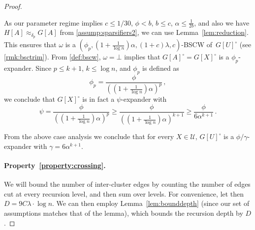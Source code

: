 \documentclass[epsfig,letter,11pt]{article}
\numberwithin{equation}{section}
\begin{document}
\begin{proof}
\begin{itemize}
		As our parameter regime implies $c \le 1/30$, $\phi < b$, $b \le c$, $\alpha \le \frac{1}{2b}$, and also we have $H[A] \approx_{\delta_p} G[A]$ from  \cref{assump:sparsifiers2}, we can use Lemma~\ref{lem:reduction}. This ensures that $\omega$ is a $(\phi_p,(1+\frac{1}{\log n})\alpha,(1+c)\lambda, c)$-BSCW of~$G[U]^\circ$ (see \cref{rmk:bsctrim}). From \cref{def:bscw}, $\omega=\bot$ implies that $G[A]^\circ=G[X]^\circ$ is a $\phi_p$-expander. Since $p \le k+1$, $k \le \log n$, and $\phi_p$ is defined as
		\begin{equation*}
			\phi_p = \frac{\phi}{\left(\left(1+\frac{1}{\log n}\right)\alpha\right)^p} \, ,
		\end{equation*}
		we conclude that $G[X]^\circ$ is in fact a $\psi$-expander with
		\begin{equation*}
			\psi = \frac{\phi}{\left(\left(1+\frac{1}{\log n}\right)\alpha\right)^p}  \ge \frac{\phi}{\left(\left(1+\frac{1}{\log n}\right)\alpha\right)^{k+1}} \ge \frac{\phi}{6\alpha^{k+1}} \, . 
		\end{equation*}
	\end{itemize}
	From the above case analysis we conclude that for every $X \in\mathcal{U}$, $G[U]^\circ$ is a $\phi/\gamma$-expander with $\gamma = 6 \alpha^{k+1}$.
	
	\paragraph{Property~\eqref{property:crossing}.} We will bound the number of inter-cluster edges by counting the number of edges cut at every recursion level, and then sum over levels. For convenience, let then $D=9C\lambda \cdot \log n$. We can then employ Lemma~\ref{lem:bounddepth} (since our set of assumptions matches that of the lemma), which bounds the recursion depth by $D$.
	

\end{proof}
\end{document}
